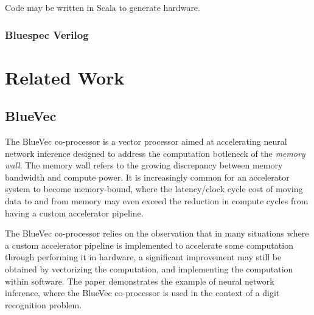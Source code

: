 \documentclass[a4paper,8pt]{report}
\begin{document}
Code may be written in Scala to generate hardware.



\subsection{Bluespec Verilog}








\chapter{Related Work} 
\section{BlueVec}
The BlueVec co-processor is a vector processor aimed at accelerating neural
network inference designed to address the computation botleneck of the
\emph{memory wall}.
The memory wall refers to the growing discrepancy between memory bandwidth and
compute power. It is increasingly common for an accelerator system to become
memory-bound, where the latency/clock cycle cost of moving data to and from
memory may even exceed the reduction in compute cycles from having a custom
accelerator pipeline.

The BlueVec co-processor relies on the observation that in many situations where
a custom accelerator pipeline is implemented to accelerate some computation
through performing it in hardware, a significant improvement may still be obtained
by vectorizing the computation, and implementing the computation within
software. The paper demonstrates the example of neural network inference, where
the BlueVec co-processor is used in the context of a digit recognition problem.
\end{document}
